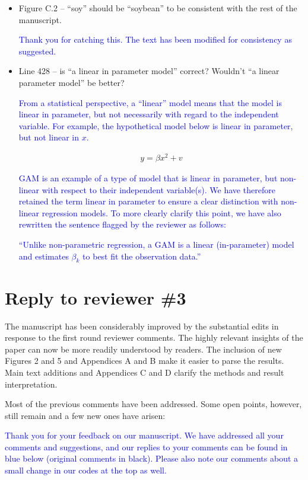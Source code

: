 \documentclass[
]{article}
\begin{document}
\begin{itemize}
\item Figure C.2 – ``soy'' should be ``soybean'' to be consistent with the rest of the manuscript.

\textcolor{blue}{Thank you for catching this. The text has been modified for consistency as suggested.}

\item Line 428 – is ``a linear in parameter model'' correct? Wouldn't ``a linear parameter model'' be better?

\textcolor{blue}{From a statistical perspective, a ``linear'' model means that the model is linear in parameter, but not necessarily with regard to the independent variable. For example, the hypothetical model below is linear in parameter, but not linear in $x$.} 

\begin{align}
  y = \beta x^2 + v
\end{align}  

\textcolor{blue}{GAM is an example of a type of model that is linear in parameter, but non-linear with respect to their independent variable(s). We have therefore retained the term linear in parameter to ensure a clear distinction with non-linear regression models. To more clearly clarify this point, we have also rewritten the sentence flagged by the reviewer as follows:}

\textcolor{blue}{``Unlike non-parametric regression, a GAM is a linear (in-parameter) model and estimates $\beta_k$ to best fit the observation data.''}

\end{itemize}

\section{Reply to reviewer \#3}

The manuscript has been considerably improved by the substantial edits in response to the first round reviewer comments. The highly relevant insights of the paper can now be more readily understood by readers. The inclusion of new Figures 2 and 5 and Appendices A and B make it easier to parse the results. Main text additions and Appendices C and D clarify the methods and result interpretation.

Most of the previous comments have been addressed. Some open points, however, still remain and a few new ones have arisen:

\textcolor{blue}{Thank you for your feedback on our manuscript. We have addressed all your comments and suggestions, and our replies to your comments can be found in blue below (original comments in black). Please also note our comments about a small change in our codes at the top as well.}
\end{document}
